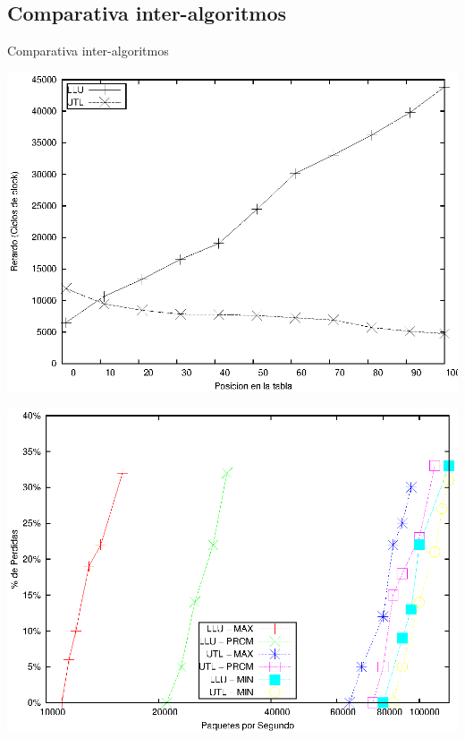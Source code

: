 \documentclass[xcolor=dvipsnames]{beamer}
\begin{document}
\subsection{Comparativa inter-algoritmos}
\begin{frame}{Comparativa inter-algoritmos} 
\begin{flushleft}
\includegraphics[scale=0.20]{figures/llu-utlsof.eps} 
\end{flushleft}
\begin{center}
\includegraphics[scale=0.70]{figures/lluvsutl.eps} 
\end{center}
\end{frame}
\end{document}
